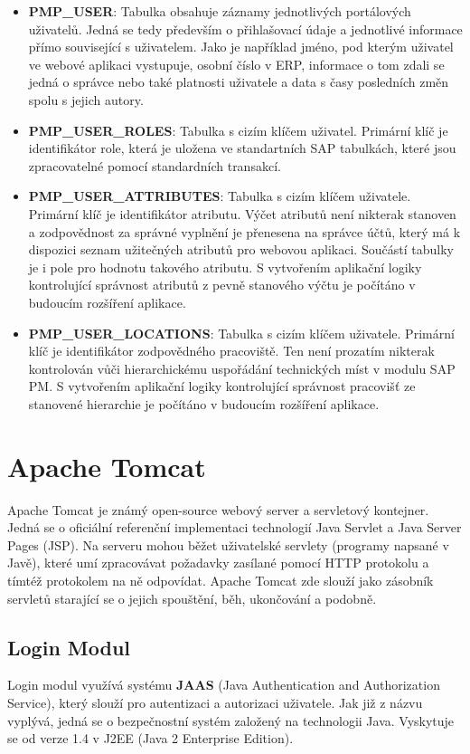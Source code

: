 \documentclass[thesis=M,czech]{FITthesis}[2012/06/26]
\begin{document}
\begin{itemize}
	\item
	\textbf{PMP\_USER}: Tabulka obsahuje záznamy jednotlivých portálových uživatelů. Jedná se tedy především o přihlašovací údaje a jednotlivé informace přímo související s uživatelem. Jako je například jméno, pod kterým uživatel ve webové aplikaci vystupuje, osobní číslo v ERP, informace o tom zdali se jedná o správce nebo také platnosti uživatele a data s časy posledních změn spolu s jejich autory.
	\item
	\textbf{PMP\_USER\_ROLES}: Tabulka s cizím klíčem uživatel. Primární klíč je identifikátor role, která je uložena ve standartních SAP tabulkách, které jsou zpracovatelné pomocí standardních transakcí.
	\item
	\textbf{PMP\_USER\_ATTRIBUTES}: Tabulka s cizím klíčem uživatele. Primární klíč je identifikátor atributu. Výčet atributů není nikterak stanoven a zodpovědnost za správné vyplnění je přenesena na správce účtů, který má k dispozici seznam užitečných atributů pro webovou aplikaci. Součástí tabulky je i pole pro hodnotu takového atributu. S vytvořením aplikační logiky kontrolující správnost atributů z pevně stanového výčtu je počítáno v budoucím rozšíření aplikace.
	\item
	\textbf{PMP\_USER\_LOCATIONS}: Tabulka s cizím klíčem uživatele. Primární klíč je identifikátor zodpovědného pracoviště. Ten není prozatím nikterak kontrolován vůči hierarchickému uspořádání technických míst v modulu SAP PM. S vytvořením aplikační logiky kontrolující správnost pracovišť ze stanovené hierarchie je počítáno v budoucím rozšíření aplikace.
\end{itemize} 

\section{Apache Tomcat}
Apache Tomcat je známý open-source webový server a servletový kontejner. Jedná se o oficiální referenční implementaci technologií Java Servlet a Java Server Pages (JSP). Na serveru mohou běžet uživatelské servlety (programy napsané v Javě), které umí zpracovávat požadavky zasílané pomocí HTTP protokolu a tímtéž protokolem na ně odpovídat. Apache Tomcat zde slouží jako zásobník servletů starající se o jejich spouštění, běh, ukončování a podobně.

\subsection{Login Modul}
\label{ssec:login_modul}
Login modul využívá systému \textbf{JAAS} (Java Authentication and Authorization Service), který slouží pro autentizaci a autorizaci uživatele. Jak již z názvu vyplývá, jedná se o bezpečnostní systém založený na technologii Java. Vyskytuje se od verze 1.4 v J2EE (Java 2 Enterprise Edition). 
\end{document}
